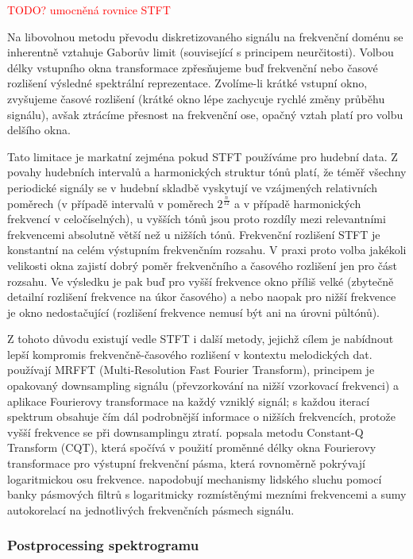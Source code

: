 \textcolor{red}{TODO? umocněná rovnice STFT }

Na libovolnou metodu převodu diskretizovaného signálu na frekvenční doménu se inherentně vztahuje Gaborův limit (související s principem neurčitosti). Volbou délky vstupního okna transformace zpřesňujeme buď frekvenční nebo časové rozlišení výsledné spektrální reprezentace. Zvolíme-li krátké vstupní okno, zvyšujeme časové rozlišení (krátké okno lépe zachycuje rychlé změny průběhu signálu), avšak ztrácíme přesnost na frekvenční ose, opačný vztah platí pro volbu delšího okna.

Tato limitace je markatní zejména pokud STFT používáme pro hudební data. Z povahy hudebních intervalů a harmonických struktur tónů platí, že téměř všechny periodické signály se v hudební skladbě vyskytují ve vzájmených relativních poměrech (v případě intervalů v poměrech $2^{\frac{n}{12}}$ a v případě harmonických frekvencí v celočíselných), u vyšších tónů jsou proto rozdíly mezi relevantními frekvencemi absolutně větší než u nižších tónů. Frekvenční rozlišení STFT je konstantní na celém výstupním frekvenčním rozsahu. V praxi proto volba jakékoli velikosti okna zajistí dobrý poměr frekvenčního a časového rozlišení jen pro část rozsahu. Ve výsledku je pak buď pro vyšší frekvence okno příliš velké (zbytečně detailní rozlišení frekvence na úkor časového) a nebo naopak pro nižší frekvence je okno nedostačující (rozlišení frekvence nemusí být ani na úrovni půltónů).

Z tohoto důvodu existují vedle STFT i další metody, jejichž cílem je nabídnout lepší kompromis frekvenčně-časového rozlišení v kontextu melodických dat. \cite{Goto1999} používají MRFFT (Multi-Resolution Fast Fourier Transform), principem je opakovaný downsampling signálu (převzorkování na nižší vzorkovací frekvenci) a aplikace Fourierovy transformace na každý vzniklý signál; s každou iterací spektrum obsahuje čím dál podrobnější informace o nižších frekvencích, protože vyšší frekvence se při downsamplingu ztratí. \cite{Brown1990} popsala metodu Constant-Q Transform (CQT), která spočívá v použití proměnné délky okna Fourierovy transformace pro výstupní frekvenční pásma, která rovnoměrně pokrývají logaritmickou osu frekvence. \cite{Paiva2004} napodobují mechanismy lidského sluchu pomocí banky pásmových filtrů s logaritmicky rozmístěnými mezními frekvencemi a sumy autokorelací na jednotlivých frekvenčních pásmech signálu.

\subsubsection{Postprocessing spektrogramu}

